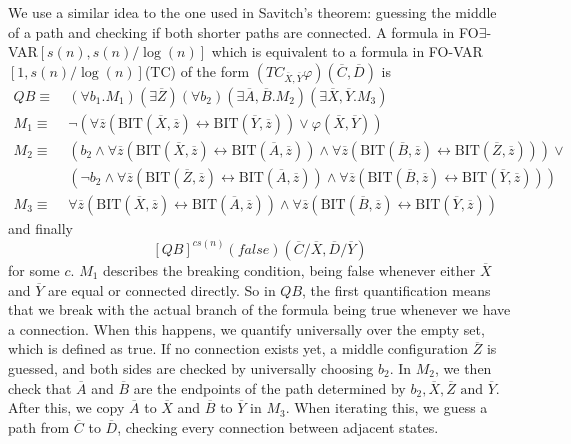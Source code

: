 We use a similar idea to the one used in Savitch's theorem: guessing the middle of a path and checking if both shorter paths are connected.
A formula in FO$\exists$-VAR$[s(n), s(n)/\log(n)]$ which is equivalent to a formula in FO-VAR$[1, s(n)/\log(n)]$(TC) of the form $\left( TC_{\overline{X}, \overline{Y}}\varphi \right)(\overline{C}, \overline{D})$ is
\[
    \begin{aligned}
        QB \equiv~& (\forall b_{1}.M_{1})(\exists\overline{Z}) (\forall b_{2})(\exists \overline{A}, \overline{B}.M_{2})(\exists\overline{X}, \overline{Y}.M_{3}) \\
        M_{1} \equiv~& \neg(\forall \overline{z} (\text{BIT}(\overline{X}, \overline{z}) \leftrightarrow \text{BIT}(\overline{Y}, \overline{z})) \lor \varphi(\overline{X}, \overline{Y})) \\
        M_{2} \equiv~&(b_{2} \land \forall \overline{z} (\text{BIT}(\overline{X}, \overline{z}) \leftrightarrow \text{BIT}(\overline{A}, \overline{z}))\land \forall \overline{z} (\text{BIT}(\overline{B}, \overline{z}) \leftrightarrow \text{BIT}(\overline{Z}, \overline{z}))) \lor \\
        &(\neg b_{2} \land \forall \overline{z} (\text{BIT}(\overline{Z}, \overline{z}) \leftrightarrow \text{BIT}(\overline{A}, \overline{z}))\land \forall \overline{z} (\text{BIT}(\overline{B}, \overline{z}) \leftrightarrow \text{BIT}(\overline{Y}, \overline{z}))) \\
        M_{3} \equiv~&\forall \overline{z} (\text{BIT}(\overline{X}, \overline{z}) \leftrightarrow \text{BIT}(\overline{A}, \overline{z}))\land \forall \overline{z} (\text{BIT}(\overline{B}, \overline{z}) \leftrightarrow \text{BIT}(\overline{Y}, \overline{z}))
    \end{aligned}
\]
and finally
\[
    [QB]^{cs(n)}(false)(\overline{C} / \overline{X}, \overline{D} / \overline{Y})
\]
for some $c$.
$M_1$ describes the breaking condition, being false whenever either $\overline{X}$ and $\overline{Y}$ are equal or connected directly.
So in $QB$, the first quantification means that we break with the actual branch of the formula being true whenever we have a connection. %
When this happens, we quantify universally over the empty set, which is defined as true.
If no connection exists yet, a middle configuration $\overline{Z}$ is guessed, and both sides are checked by universally choosing $b_2$.
In $M_2$, we then check that $\overline{A}$ and $\overline{B}$ are the endpoints of the path determined by $b_2, \overline{X}, \overline{Z} \text{ and }\overline{Y}$.
After this, we copy $\overline{A}$ to $\overline{X}$ and $\overline{B}$ to $\overline{Y}$ in $M_3$.
When iterating this, we guess a path from $\overline{C}$ to $\overline{D}$, checking every connection between adjacent states.

